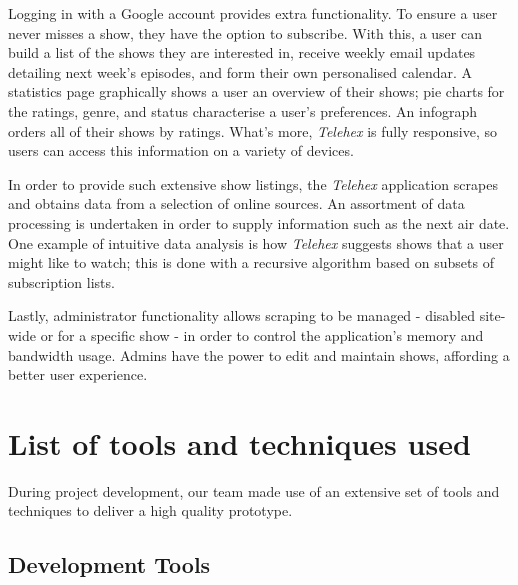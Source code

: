\documentclass[12pt, a4paper]{article}
\begin{document}
Logging in with a Google account provides extra functionality. To ensure a user never misses a show, they have the option to subscribe. With this, a user can build a list of the shows they are interested in, receive weekly email updates detailing next week's episodes, and form their own personalised calendar. A statistics page graphically shows a user an overview of their shows; pie charts for the ratings, genre, and status characterise a user's preferences. An infograph orders all of their shows by ratings.  What's more, \textit{Telehex} is fully responsive, so users can access this information on a variety of devices. 

In order to provide such extensive show listings, the \textit{Telehex} application scrapes and obtains data from a selection of online sources. An assortment of data processing is undertaken in order to supply information such as the next air date. One example of intuitive data analysis is how \textit{Telehex} suggests shows that a user might like to watch; this is done with a recursive algorithm based on subsets of subscription lists. 

Lastly, administrator functionality allows scraping to be managed - disabled site-wide or for a specific show - in order to control the application's memory and bandwidth usage. Admins have the power to edit and maintain shows, affording a better user experience.
\newpage
\section{List of tools and techniques used}

During project development, our team made use of an extensive set of tools and techniques to deliver a high quality prototype.

\subsection{Development Tools}
\end{document}
